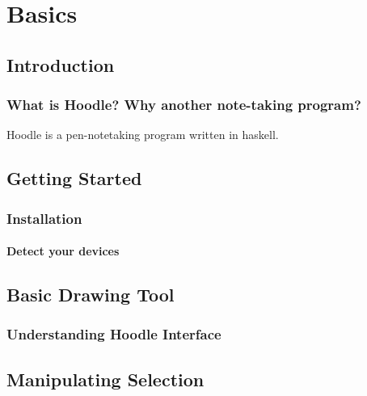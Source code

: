 \documentclass[11pt,fleqn]{book} %
\begin{document}

\clearpage
{}
\setcounter{page}{1}

\part{Basics}




\chapter{Introduction}

\section{What is Hoodle? Why another note-taking program?}

Hoodle is a pen-notetaking program written in haskell.


\chapter{Getting Started}

\section{Installation}
\subsection{Detect your devices}

\chapter{Basic Drawing Tool} 

\section{Understanding Hoodle Interface}

\chapter{Manipulating Selection}%
\end{document}
